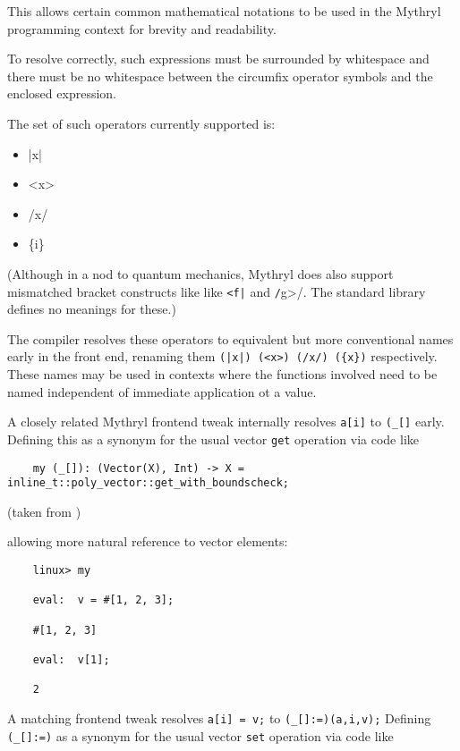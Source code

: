This allows certain common mathematical notations to be used in 
the Mythryl programming context for brevity and readability.

To resolve correctly, such expressions must be surrounded by whitespace 
and there must be no whitespace between the circumfix operator 
symbols and the enclosed expression.

The set of such operators currently supported is:

\begin{itemize}
\item |x|
\item <x>
\item /x/
\item \{i\}
\end{itemize}

(Although in a nod to quantum mechanics, Mythryl does also support mismatched bracket 
constructs like like \verb/<f|/ and \verb|/|g>/.  The standard library defines 
no meanings for these.)

The compiler resolves these operators to equivalent but more conventional 
names early in the front end, renaming them {\tt (|x|) (<x>) (/x/) (\{x\})} 
respectively.  These names may be used in contexts where the functions 
involved need to be named independent of immediate application ot a value.

A closely related Mythryl frontend tweak internally resolves {\tt a[i]} 
to {\tt (\_[]} early.  Defining this as a synonym for the usual vector 
{\tt get} operation via code like

\begin{verbatim}
    my (_[]): (Vector(X), Int) -> X = inline_t::poly_vector::get_with_boundscheck;
\end{verbatim}

(taken from )

allowing more natural reference to vector elements:

\begin{verbatim}
    linux> my

    eval:  v = #[1, 2, 3];

    #[1, 2, 3]

    eval:  v[1];

    2
\end{verbatim}

A matching frontend tweak resolves {\tt a[i] = v;} 
to {\tt (\_[]:=)(a,i,v);}  Defining {\tt (\_[]:=)} as a synonym 
for the usual vector {\tt set} operation via code like

